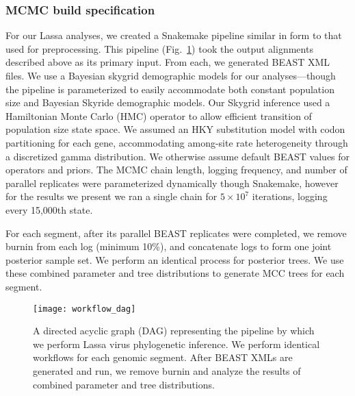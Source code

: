\subsubsection{MCMC build specification}

For our Lassa analyses, we created a Snakemake pipeline similar in form to that used for preprocessing.
This pipeline (Fig.~\ref{fig:workflow_dag}) took the output alignments described above as its primary input.
From each, we generated BEAST XML files.
We use a Bayesian skygrid demographic models for our analyses---though the pipeline is parameterized to easily accommodate both constant population size and Bayesian Skyride demographic models.
Our Skygrid inference used a Hamiltonian Monte Carlo (HMC) operator to allow efficient transition of population size state space. %
We assumed an HKY substitution model with codon partitioning for each gene, accommodating among-site rate heterogeneity through a discretized gamma distribution.
We otherwise assume default BEAST values for operators and priors.
The MCMC chain length, logging frequency, and number of parallel replicates were parameterized dynamically though Snakemake, however for the results we present we ran a single chain for $5\times10^7$ iterations, logging every 15,000th state.

For each segment, after its parallel BEAST replicates were completed, we remove burnin from each log (minimum 10\%), and concatenate logs to form one joint posterior sample set.
We perform an identical process for posterior trees.
We use these combined parameter and tree distributions to generate MCC trees for each segment.

\begin{figure}[ht]
  \centering
  \medskip
  \texttt{[image: workflow\_dag]}
  \caption[Lassa phylogenetics pipeline]{A directed acyclic graph (DAG) representing the pipeline by which we perform Lassa virus phylogenetic inference. We perform identical workflows for each genomic segment. After BEAST XMLs are generated and run, we remove burnin and analyze the results of combined parameter and tree distributions.}
  \label{fig:workflow_dag}
\end{figure}

\cleardoublepage

